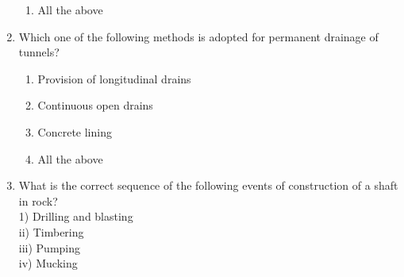\documentclass[11pt,a4paper]{article}
\begin{document}
\begin{enumerate}
\begin{enumerate}[label=\Alph*.]
\item{All the above}
\end{enumerate}
\item{Which one of the following methods is adopted for permanent drainage of tunnels?}
\begin{enumerate}[label=\Alph*.]
\item{Provision of longitudinal drains}
\item{Continuous open drains}
\item{Concrete lining}
\item{All the above}
\end{enumerate}
\item{What is the correct sequence of the following events of construction of a shaft in rock? \\

1) Drilling and blasting \\

ii) Timbering \\

iii) Pumping \\

iv) Mucking \\

}
\end{enumerate}
\end{document}
